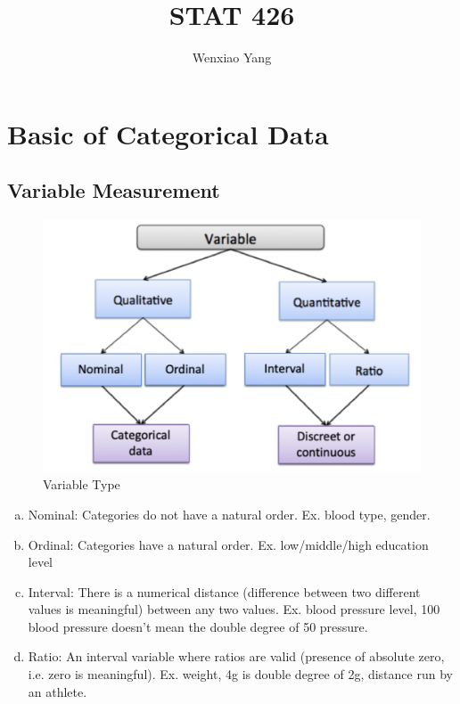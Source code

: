 \documentclass[11pt]{elegantbook}
\title{\textbf{STAT 426}}
\author{Wenxiao Yang}
\institute{Department of Mathematics, University of Illinois at Urbana-Champaign}
\date{}
\begin{document}
\maketitle
\frontmatter
\tableofcontents
\mainmatter

\chapter{Basic of Categorical Data}
\section{Variable Measurement}
\begin{center}\begin{figure}[htbp]
    \centering
    \includegraphics[scale=0.3]{p1.png}
    \caption{Variable Type}
    \label{}
\end{figure}\end{center}
\begin{enumerate}[a)]
    \item Nominal: Categories do not have a natural order. Ex. blood type, gender.
    \item Ordinal: Categories have a natural order. Ex. low/middle/high education level
    \item Interval: There is a numerical distance (difference between two different values is meaningful) between any two values.
    Ex. blood pressure level, 100 blood pressure doesn't mean the double degree of 50 pressure.
    \item Ratio: An interval variable where ratios are valid (presence of absolute zero, i.e. zero is meaningful). Ex. weight, 4g is double degree of 2g, distance run by an athlete.
\end{enumerate}
\end{document}
